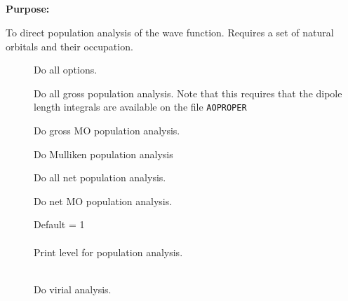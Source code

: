 \pagebreak[3]
\subsection{\label{ref-popinp}}

{\bf Purpose:}

To direct population analysis of the wave function.
Requires a set of natural orbitals and their occupation.

\begin{description}
\item[]
  Do all options.


\item[]
  Do all gross population analysis. Note that this requires that the dipole
  length integrals are available on the file \verb|AOPROPER|

\item[]
  Do gross MO population analysis.

\item[]
  Do Mulliken population analysis

\item[]
  Do all net population analysis.

\item[]
  Do net MO population analysis.

\item[]
  Default = 1\\
   \\
  Print level for population analysis.


\item[] \ \\
  Do virial analysis.
\end{description}

